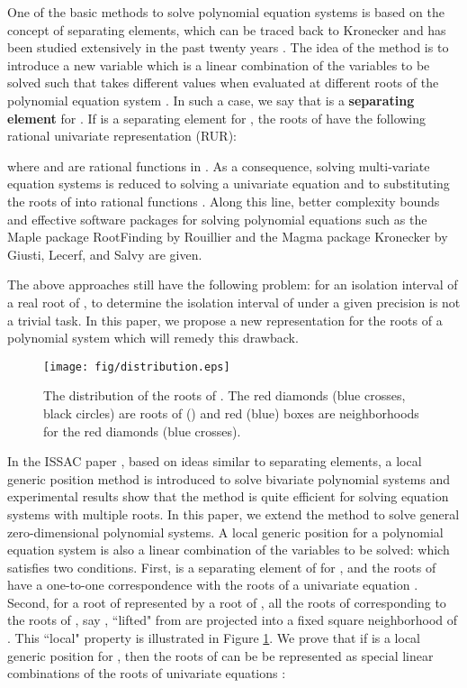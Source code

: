 \documentclass[amsthm]{JSC_LaTex_2007_Mar_12/elsart}
\begin{document}
One of the basic methods to solve polynomial equation systems is
based on the concept of separating elements, which can be traced
back to Kronecker \cite{kronecker} and has been studied extensively
in the past twenty years
\cite{abrw,canny,chengjsc,gaochou,gm,gh,gls,kmh,kff,ll,renegar,rur,ynt}.
The idea of the method is to introduce a new variable  which is a linear combination of the variables to be solved
such that  takes different values when evaluated
at different roots of the polynomial equation system
. In such a case, we say that  is a {\bf
separating element} for . If  is a
{separating element} for ,  the roots of
 have the following rational univariate
representation (RUR):

where  and  are rational functions in . As a
consequence, solving multi-variate equation systems is reduced to
solving a univariate equation  and to substituting the roots
of  into rational functions .
Along this line, better complexity bounds and effective software
packages for solving polynomial equations such as the Maple package
RootFinding by Rouillier \cite{rur} and the Magma package Kronecker
by Giusti, Lecerf, and Salvy \cite{gls} are given.

The above approaches still have the following problem: for an
isolation interval  of a real root  of , to
determine the isolation interval of  under a given
precision is not a trivial task.
In this paper, we propose a new representation for the roots of a
polynomial system which will remedy this drawback.


\begin{figure}[ht]
\centering
\begin{minipage}{0.9\textwidth}
\centering
 \texttt{[image: fig/distribution.eps]}
 \caption{The distribution of the roots of . The red diamonds (blue crosses, black circles) are roots of  () and red (blue) boxes are neighborhoods for the red diamonds (blue crosses).}
\label{fig-slope}
\end{minipage}
\end{figure}


In the ISSAC paper \cite{lgp-bi}, based on ideas similar to
separating elements, a local generic position method is introduced
to solve bivariate polynomial systems and experimental results show
that the method is quite efficient for solving equation systems with
multiple roots.
In this paper, we extend the method to solve general
zero-dimensional polynomial systems. A local generic position for a
polynomial equation system  is also a linear combination of
the variables to be solved:  which satisfies two
conditions.
First,   is a separating element of
 for
, and the roots of  have a one-to-one
correspondence with the roots of a univariate equation .
Second, for a root  of 
represented by a root  of , all the roots 
of  corresponding to the roots of
, say , ``lifted" from
 are projected into a fixed square neighborhood of . This
``local" property is illustrated in Figure \ref{fig-slope}.
We prove that if  is a local generic
position for , then the roots of  can be
be represented as special linear combinations of the roots of
univariate equations :
 
\end{document}
